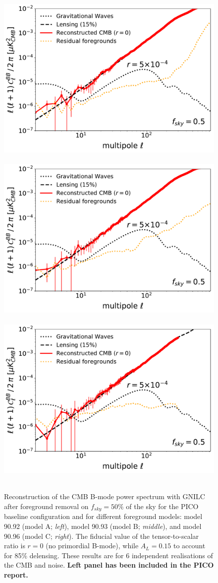 \documentclass[12pt]{article}
\begin{document}
\begin{figure}
  \begin{center}
    \includegraphics[width=0.33\columnwidth]{figures_memo/gnilc_pico_90p92_r0_AL0p15_mc_test3_final.pdf}~
     \includegraphics[width=0.33\columnwidth]{figures_memo/gnilc_pico_90p93_r0_AL0p15_mc_test3_final.pdf}~
     \includegraphics[width=0.33\columnwidth]{figures_memo/gnilc_pico_90p96_r0_AL0p15_mc_test3_final.pdf}~	
  \end{center}
\caption{Reconstruction of the CMB B-mode power spectrum with GNILC after foreground removal on $f_{sky}=50\%$ of the sky for the PICO baseline configuration and for different foreground models: model 90.92 (model A; \emph{left}), model 90.93 (model B; \emph{middle}), and model 90.96 (model C; \emph{right}). The fiducial value of the tensor-to-scalar ratio is $r=0$ (no primordial B-mode), while $A_L=0.15$ to account for 85\% delensing. These results are for 6 independent realisations of the CMB and noise. {\bf Left panel has been included in the PICO report.}}
\label{Fig:gnilc_ps_r0_AL0p15}
\end{figure}
\end{document}
